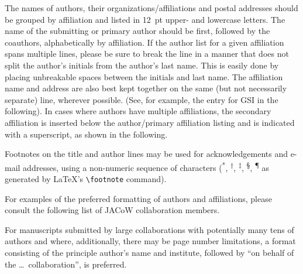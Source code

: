 %
%

\flushcolsend

The names of authors, their organizations/affiliations
and postal addresses should be grouped by affiliation and
listed in \SI{12}{pt} upper- and lowercase letters. The name of
the submitting or primary author should be first, followed
by the coauthors, alphabetically by affiliation. If the
author list for a given affiliation spans multiple lines,
please be sure to break the line in a manner that does not
split the author’s initials from the author’s last name. This
is easily done by placing unbreakable spaces between the
initials and last name. The affiliation name and address
are also best kept together on the same (but not necessarily
separate) line, wherever possible. (See, for example,
the entry for GSI in the following). In cases where authors
have multiple affiliations, the secondary affiliation is
inserted below the author/primary affiliation listing and is
indicated with a superscript, as shown in the following.


Footnotes on the title and author lines may be used for
acknowledgements and e-mail addresses, using a non-numeric
sequence of characters (\textsuperscript{*}, \textsuperscript{†},
\textsuperscript{‡}, \textsuperscript{§}, \textsuperscript{\P}
as generated by \LaTeX's \verb|\footnote| command).

For examples of the preferred formatting of authors and
affiliations, please consult the following list of JACoW
collaboration members.

For manuscripts submitted by large collaborations with
potentially many tens of authors and where, additionally,
there may be page number limitations, a format consisting
of the principle author’s name and institute, followed by
“on behalf of the \ldots\ collaboration”, is preferred.


\clearpage
%
%
{}

\clearpage


